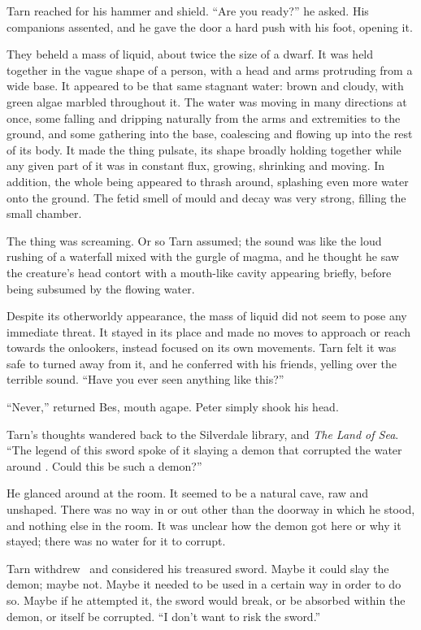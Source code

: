 Tarn reached for his hammer and shield.  ``Are you ready?'' he asked.  His companions assented, and he gave the door a hard push with his foot, opening it.

They beheld a mass of liquid, about twice the size of a dwarf.  It was held together in the vague shape of a person, with a head and arms protruding from a wide base.  It appeared to be that same stagnant water: brown and cloudy, with green algae marbled throughout it.  The water was moving in many directions at once, some falling and dripping naturally from the arms and extremities to the ground, and some gathering into the base, coalescing and flowing up into the rest of its body.  It made the thing pulsate, its shape broadly holding together while any given part of it was in constant flux, growing, shrinking and moving.  In addition, the whole being appeared to thrash around, splashing even more water onto the ground.  The fetid smell of mould and decay was very strong, filling the small chamber.

The thing was screaming.  Or so Tarn assumed; the sound was like the loud rushing of a waterfall mixed with the gurgle of magma, and he thought he saw the creature's head contort with a mouth-like cavity appearing briefly, before being subsumed by the flowing water.

Despite its otherworldy appearance, the mass of liquid did not seem to pose any immediate threat.  It stayed in its place and made no moves to approach or reach towards the onlookers, instead focused on its own movements.  Tarn felt it was safe to turned away from it, and he conferred with his friends, yelling over the terrible sound.  ``Have you ever seen anything like this?''

``Never,'' returned Bes, mouth agape.  Peter simply shook his head.

Tarn's thoughts wandered back to the Silverdale library, and \emph{The Land of Sea}.  ``The legend of this sword spoke of it slaying a demon that corrupted the water around \atmudarant.  Could this be such a demon?''

He glanced around at the room.  It seemed to be a natural cave, raw and unshaped.  There was no way in or out other than the doorway in which he stood, and nothing else in the room.  It was unclear how the demon got here or why it stayed; there was no water for it to corrupt.

Tarn withdrew \kildir\ and considered his treasured sword.  Maybe it could slay the demon; maybe not.  Maybe it needed to be used in a certain way in order to do so.  Maybe if he attempted it, the sword would break, or be absorbed within the demon, or itself be corrupted. ``I don't want to risk the sword.''

